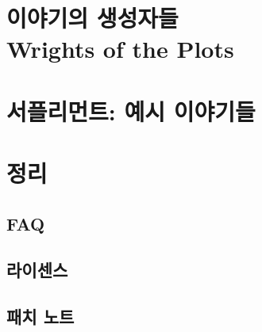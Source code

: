 \documentclass[8pt,b5paper]{book}
\let\oldhyperlink\hyperlink
\let\oldhref\href
\renewcommand{\hyperlink}[2]{#2(\pageref{#1}쪽)}
\renewcommand{\href}[2]{#2(\url{#1})}
\begin{document}
	\part{이야기의 생성자들 \\ Wrights of the Plots}
		
	
	\ifprintout\else
	\part{서플리먼트: 예시 이야기들}
		
	\fi
	
	\ifprintout\else
	\part{정리}
	\fi
%			
		
		\ifprintout\else
		\chapter*{FAQ}
			
		\fi
		
		\chapter*{라이센스}
			 
		
		\ifprintout\else
		\chapter*{패치 노트}
			
		
			\printindex
		\fi
	
	\vspace*{\fill}
	
	\ifprintout
		\let\hyperlink\oldhyperlink
		\let\href\oldhref
	\fi
	
	{\doclicenseThis}
	
	\ifprintout
		\let\oldhyperlink\hyperlink
		\let\oldhref\href
		
		\renewcommand{\hyperlink}[2]{#2(\pageref{#1} 쪽)}
		\renewcommand{\href}[2]{#2(\url{#1})}
	\fi
	
\end{document}
